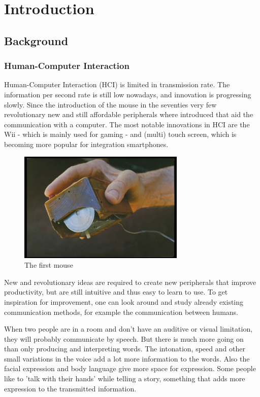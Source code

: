 
\chapter{Introduction}
\label{ch:intro}

\section{Background}
\subsection*{Human-Computer Interaction}
Human-Computer Interaction (HCI) is limited in transmission rate. The information per second rate is still low nowadays, and innovation is progressing slowly. Since the introduction of the mouse in the seventies very few revolutionary new and still affordable peripherals where introduced that aid the communication with a computer. The most notable innovations in HCI are the Wii - which is mainly used for gaming - and (multi) touch screen, which is becoming more popular for integration smartphones.

\begin{figure}[htbp]
	\center{}
	\label{fig:mouse}
	\includegraphics[width=0.3\linewidth]{figures/mouse.jpg}
	\caption{The first mouse}
\end{figure}

New and revolutionary ideas are required to create new peripherals that improve productivity, but are still intuitive and thus easy to learn to use. To get inspiration for improvement, one can look around and study already existing communication methods, for example the communication between humans. 

When two people are in a room and don't have an auditive or visual limitation, they will probably communicate by speech. But there is much more going on than only producing and interpreting words. The intonation, speed and other small variations in the voice add a lot more information to the words. Also the facial expression and body language give more space for expression. Some people like to 'talk with their hands' while telling a story, something that adds more expression to the transmitted information.

